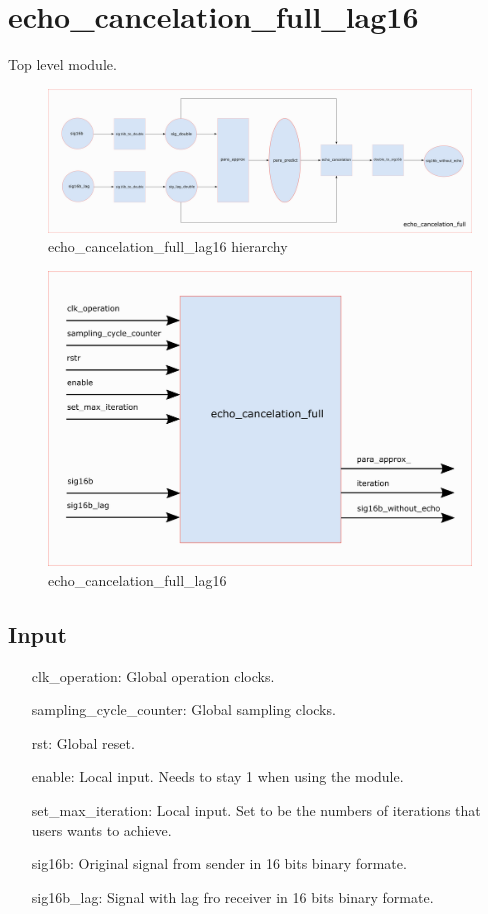 \documentclass[twoside,a4paper]{refart}
\begin{document}
\section{echo\_cancelation\_full\_lag16}
Top level module. 
\begin{figure}[H]
	\centering
	\includegraphics[scale=0.7]{echo_cancelation_full.png}
	\caption{echo\_cancelation\_full\_lag16 hierarchy}
	\label{}
\end{figure}
\begin{figure}[H]
	\centering
	\includegraphics[scale=1.2]{echo_cancelation_full_module.png}
	\caption{echo\_cancelation\_full\_lag16}
	\label{}
\end{figure}
\subsection{Input}
\begin{itemize}
		\item[clk\_operation:] Global operation clocks.
		\item[sampling\_cycle\_counter:] Global sampling clocks.
		\item[rst:      ] Global reset.
		\item[enable:] Local input. Needs to stay 1 when using the module.
		\item[set\_max\_iteration:] Local input. Set to be the numbers of iterations that users wants to achieve.
		\item[sig16b:] Original signal from sender in 16 bits binary formate.
		\item[sig16b\_lag:] Signal with lag fro receiver in 16 bits binary formate.
\end{itemize}
\end{document}
